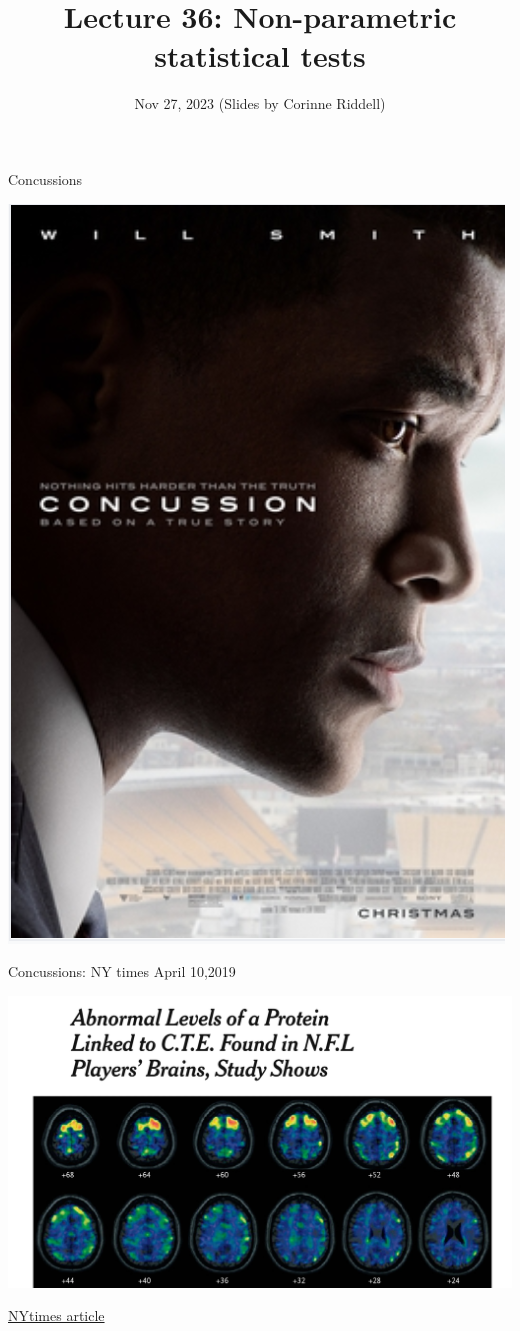 \documentclass[
  ignorenonframetext,
  aspectratio=169]{beamer}
\title{Lecture 36: Non-parametric statistical tests}
\subtitle{Nov 27, 2023 (Slides by Corinne Riddell)}
\author{}
\date{\vspace{-2.5em}}
\begin{document}
\frame{\titlepage}

\begin{frame}
\end{frame}

\begin{frame}{Concussions}
\protect\hypertarget{concussions}{}
\begin{center}\includegraphics[width=0.5\linewidth]{./images/concussionmovie} \end{center}
\end{frame}

\begin{frame}{Concussions: NY times April 10,2019}
\protect\hypertarget{concussions-ny-times-april-102019}{}
\begin{center}\includegraphics[width=0.8\linewidth]{./images/concussion_nytimes} \end{center}

\href{https://www.nytimes.com/2019/04/10/health/concussion-nfl-football-cte.html}{NYtimes
article}
\end{frame}
\end{document}
